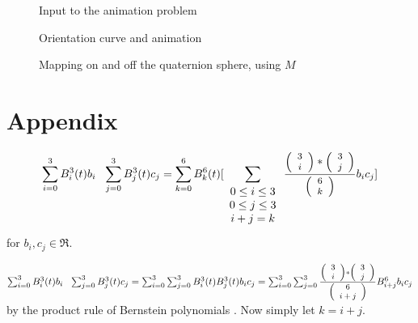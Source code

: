 \clearpage

\begin{figure}
\vspace{2.5in}
\caption{Input to the animation problem}
\label{fig:input}
\end{figure}

\begin{figure*}
\vspace{2in}
\caption{Orientation curve and animation}
\label{fig:output}
\end{figure*}

\begin{figure}
\vspace{2.5in}
\caption{Mapping on and off the quaternion sphere, using $M$}
\label{fig:method}
\end{figure}

\ifFull %
\section{Appendix}

\begin{lemma}
\label{lem:product}
\begin{equation}
\sum_{i=0}^{3} B_i^3(t) b_i \ \ \sum_{j=0}^{3} B_j^3(t) c_j
= \sum_{k=0}^{6} B_k^6(t) [\sum_{\begin{array}{c} 0 \leq i \leq 3 \\ 
			     0 \leq j \leq 3 \\ 
			     i+j=k
			     \end{array}}
	\frac{\mbox{\footnotesize{$\left( \begin{array}{c} 3 \\ i \end{array} \right)$}} * \mbox{\footnotesize{$\left( \begin{array}{c} 3 \\ j \end{array} \right)$}}}{\mbox{\footnotesize{$\left( \begin{array}{c} 6 \\ k \end{array} \right)$}}}  b_i c_j ]
\end{equation}
for $b_i,c_j \in \Re$.
\end{lemma}
\prf
$\sum_{i=0}^{3} B_i^3(t) b_i \ \ \sum_{j=0}^{3} B_j^3(t) c_j
= \sum_{i=0}^{3} \sum_{j=0}^{3} B_i^3(t) B_j^3(t) b_i c_j
= \sum_{i=0}^{3} \sum_{j=0}^{3} 
	\frac{\choice{3}{i}*\choice{3}{j}}{\choice{6}{i+j}}
	B_{i+j}^6 b_i c_j$
by the product rule of Bernstein polynomials \cite{farin93}.
Now simply let $k=i+j$.
\QED
\fi %

